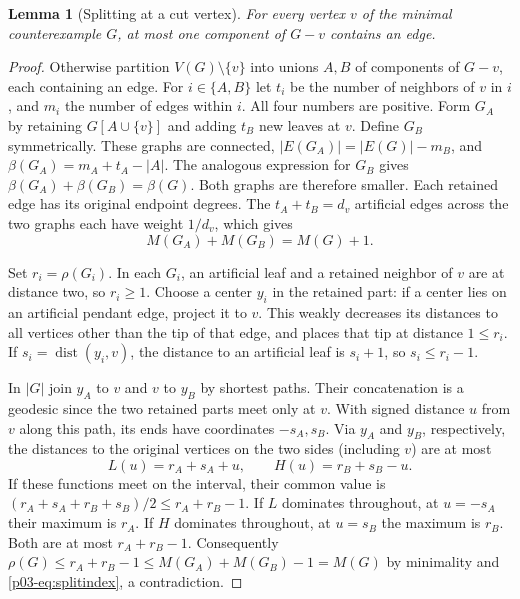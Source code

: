 \documentclass[11pt,a4paper]{article}
\newtheorem{lemma}[theorem]{Lemma}\newtheorem{corollary}[theorem]{Corollary}
\newcommand{\dist}{\operatorname{dist}}\newcommand{\ecc}{\operatorname{ecc}}
\begin{document}
\begin{lemma}[Splitting at a cut vertex]\label{p03-lem:split}
For every vertex $v$ of the minimal counterexample $G$, at most one
component of $G-v$ contains an edge.
\end{lemma}
\begin{proof}
Otherwise partition $V(G)\setminus\{v\}$ into unions $A,B$ of components
of $G-v$, each containing an edge. For $i\in\{A,B\}$ let $t_i$ be
the number of neighbors of $v$ in $i$, and $m_i$ the number of edges
within $i$. All four numbers are positive. Form $G_A$ by retaining
$G[A\cup\{v\}]$ and adding $t_B$ new leaves at $v$. Define $G_B$
symmetrically. These graphs are connected, $|E(G_A)|=|E(G)|-m_B$,
and $\beta(G_A)=m_A+t_A-|A|$. The analogous expression for $G_B$
gives $\beta(G_A)+\beta(G_B)=\beta(G)$. Both graphs are therefore
smaller. Each retained edge has its original endpoint degrees.
The $t_A+t_B=d_v$ artificial edges across the two graphs each have
weight $1/d_v$, which gives
\begin{equation}\label{p03-eq:splitindex}
 M(G_A)+M(G_B)=M(G)+1 .
\end{equation}

Set $r_i=\rho(G_i)$. In each $G_i$, an artificial leaf and a retained
neighbor of $v$ are at distance two, so $r_i\ge1$. Choose a center
$y_i$ in the retained part: if a center lies on an artificial pendant
edge, project it to $v$. This weakly decreases its distances to all
vertices other than the tip of that edge, and places that tip at
distance $1\le r_i$. If $s_i=\dist(y_i,v)$, the distance to an
artificial leaf is $s_i+1$, so $s_i\le r_i-1$.

In $|G|$ join $y_A$ to $v$ and $v$ to $y_B$ by shortest paths. Their
concatenation is a geodesic since the two retained parts meet only at
$v$. With signed distance $u$ from $v$ along this path, its ends have
coordinates $-s_A,s_B$. Via $y_A$ and $y_B$, respectively, the
distances to the original vertices on the two sides (including $v$)
are at most
\[
 L(u)=r_A+s_A+u,\qquad H(u)=r_B+s_B-u .
\]
If these functions meet on the interval, their common value is
$(r_A+s_A+r_B+s_B)/2\le r_A+r_B-1$. If $L$ dominates throughout,
at $u=-s_A$ their maximum is $r_A$. If $H$ dominates throughout,
at $u=s_B$ the maximum is $r_B$. Both are at most $r_A+r_B-1$.
Consequently $\rho(G)\le r_A+r_B-1\le M(G_A)+M(G_B)-1=M(G)$ by
minimality and \eqref{p03-eq:splitindex}, a contradiction.
\end{proof}
\end{document}
